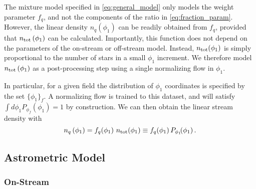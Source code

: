 \documentclass[twocolumn, linenumbers]{aastex631}
\begin{document}
        The mixture model specified in \autoref{eq:general_model} only models
        the weight parameter $f_q$, and not the components of the ratio in
        \autoref{eq:fraction_param}. However, the linear density $n_q(\phi_1)$
        can be readily obtained from $f_q$, provided that $n_{\rm
        tot}\left(\phi_1\right)$ can be calculated. Importantly, this function
        does not depend on the parameters of the on-stream or off-stream model.
        Instead, $n_{\rm tot}(\phi_1)$ is simply proportional to the number of
        stars in a small $\phi_1$ increment. We therefore model $n_{\rm
        tot}\left(\phi_1\right)$ as a post-processing step using a single
        normalizing flow in $\phi_1$. 

        In particular, for a given field the distribution of $\phi_1$
        coordinates is specified by the set $\{\phi_1\}_f$. A normalizing flow
        is trained to this dataset, and will satisfy $\int d\phi_1
        P_{\phi_f}(\phi_1) = 1$ by construction.  We can then obtain the linear
        stream density with
        \begin{equation}
            n_q\left(\phi_1\right) = f_q\!\left(\phi_1\right) \, n_{\rm tot}\!\left(\phi_1\right)  \equiv f_q\!\left(\phi_1\right) P_{\phi_1}\!\!\left(\phi_1\right) .
        \end{equation}

    
        
    \subsection{Astrometric Model} \label{sub:method:astrometric_model}

        \subsubsection{On-Stream} \label{ssub:method:astrometric_model:on_stream}
    
\end{document}
